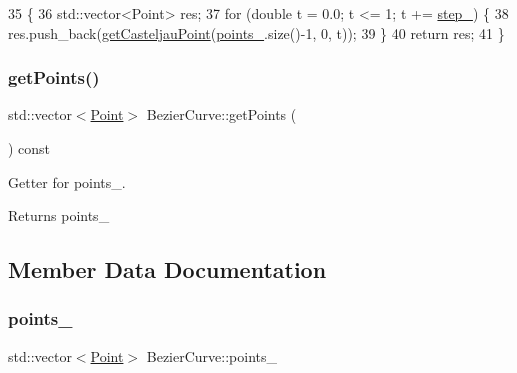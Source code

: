 \begin{DoxyCode}
35                                              \{
36     std::vector<Point> res;
37     \textcolor{keywordflow}{for} (\textcolor{keywordtype}{double} t = 0.0; t <= 1; t += \mbox{\hyperlink{class_bezier_curve_a308d7d0afc02da11ed0020508d537818}{step\_}}) \{
38         res.push\_back(\mbox{\hyperlink{class_bezier_curve_a7e0c40cb373da6aa1aa1acd5fce9d503}{getCasteljauPoint}}(\mbox{\hyperlink{class_bezier_curve_a73c8f89d9002be75295e6a0546547189}{points\_}}.size()-1, 0, t));
39     \}
40     \textcolor{keywordflow}{return} res;
41 \}
\end{DoxyCode}
\mbox{\label{class_bezier_curve_a0ebb942d8285628bead89d154f39e616}} 
\subsubsection{\texorpdfstring{get\+Points()}{getPoints()}}
{\footnotesize\ttfamily std\+::vector$<$\mbox{\hyperlink{class_point}{Point}}$>$ Bezier\+Curve\+::get\+Points (\begin{DoxyParamCaption}{ }\end{DoxyParamCaption}) const}



Getter for points\+\_\+. 

\begin{DoxyReturn}{Returns}
points\+\_\+ 
\end{DoxyReturn}


\subsection{Member Data Documentation}
\mbox{\label{class_bezier_curve_a73c8f89d9002be75295e6a0546547189}} 
\subsubsection{\texorpdfstring{points\+\_\+}{points\_}}
{\footnotesize\ttfamily std\+::vector$<$\mbox{\hyperlink{class_point}{Point}}$>$ Bezier\+Curve\+::points\+\_\+\hspace{0.3cm}{\ttfamily [private]}}

